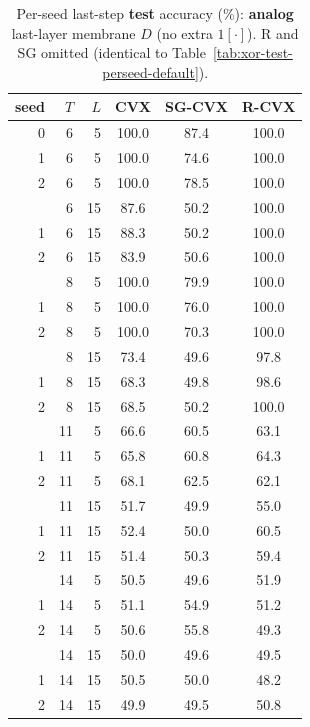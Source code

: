 \documentclass[11pt]{article}
\begin{document}
\begin{table}[p]
\centering
\caption{Per-seed last-step \textbf{test} accuracy (\%): \textbf{analog} last-layer membrane $D$ (no extra $1[\cdot]$). R and SG omitted (identical to Table~\ref{tab:xor-test-perseed-default}).}
\label{tab:xor-test-perseed-analog}
\begin{tabular}{rrrccc}
\toprule
seed & $T$ & $L$ & CVX & SG-CVX & R-CVX \\
\midrule
0 & 6 & 5 & 100.0 & 87.4 & 100.0 \\
1 & 6 & 5 & 100.0 & 74.6 & 100.0 \\
2 & 6 & 5 & 100.0 & 78.5 & 100.0 \\
\addlinespace
0 & 6 & 15 & 87.6 & 50.2 & 100.0 \\
1 & 6 & 15 & 88.3 & 50.2 & 100.0 \\
2 & 6 & 15 & 83.9 & 50.6 & 100.0 \\
\addlinespace
0 & 8 & 5 & 100.0 & 79.9 & 100.0 \\
1 & 8 & 5 & 100.0 & 76.0 & 100.0 \\
2 & 8 & 5 & 100.0 & 70.3 & 100.0 \\
\addlinespace
0 & 8 & 15 & 73.4 & 49.6 & 97.8 \\
1 & 8 & 15 & 68.3 & 49.8 & 98.6 \\
2 & 8 & 15 & 68.5 & 50.2 & 100.0 \\
\addlinespace
0 & 11 & 5 & 66.6 & 60.5 & 63.1 \\
1 & 11 & 5 & 65.8 & 60.8 & 64.3 \\
2 & 11 & 5 & 68.1 & 62.5 & 62.1 \\
\addlinespace
0 & 11 & 15 & 51.7 & 49.9 & 55.0 \\
1 & 11 & 15 & 52.4 & 50.0 & 60.5 \\
2 & 11 & 15 & 51.4 & 50.3 & 59.4 \\
\addlinespace
0 & 14 & 5 & 50.5 & 49.6 & 51.9 \\
1 & 14 & 5 & 51.1 & 54.9 & 51.2 \\
2 & 14 & 5 & 50.6 & 55.8 & 49.3 \\
\addlinespace
0 & 14 & 15 & 50.0 & 49.6 & 49.5 \\
1 & 14 & 15 & 50.5 & 50.0 & 48.2 \\
2 & 14 & 15 & 49.9 & 49.5 & 50.8 \\
\bottomrule
\end{tabular}
\end{table}
\end{document}
